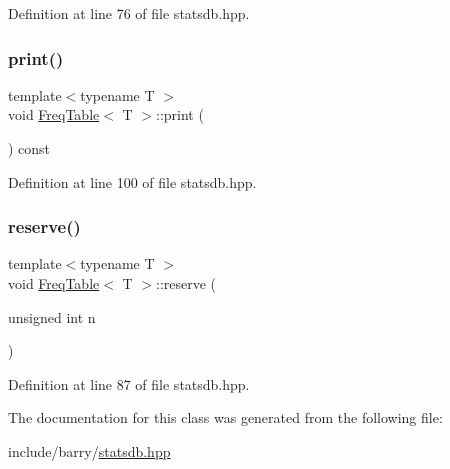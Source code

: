 Definition at line 76 of file statsdb.\+hpp.

\mbox{\label{class_freq_table_a4fe8f5e3b5bf64a1cbaf99deb96298d4}} 
\subsubsection{\texorpdfstring{print()}{print()}}
{\footnotesize\ttfamily template$<$typename T $>$ \\
void \hyperlink{class_freq_table}{Freq\+Table}$<$ T $>$\+::print (\begin{DoxyParamCaption}{ }\end{DoxyParamCaption}) const\hspace{0.3cm}{\ttfamily [inline]}}



Definition at line 100 of file statsdb.\+hpp.

\mbox{\label{class_freq_table_a0bdced25f7c0bee38e073c4654578d19}} 
\subsubsection{\texorpdfstring{reserve()}{reserve()}}
{\footnotesize\ttfamily template$<$typename T $>$ \\
void \hyperlink{class_freq_table}{Freq\+Table}$<$ T $>$\+::reserve (\begin{DoxyParamCaption}\item[{unsigned int}]{n }\end{DoxyParamCaption})\hspace{0.3cm}{\ttfamily [inline]}}



Definition at line 87 of file statsdb.\+hpp.



The documentation for this class was generated from the following file\+:\begin{DoxyCompactItemize}
\item 
include/barry/\hyperlink{statsdb_8hpp}{statsdb.\+hpp}\end{DoxyCompactItemize}
